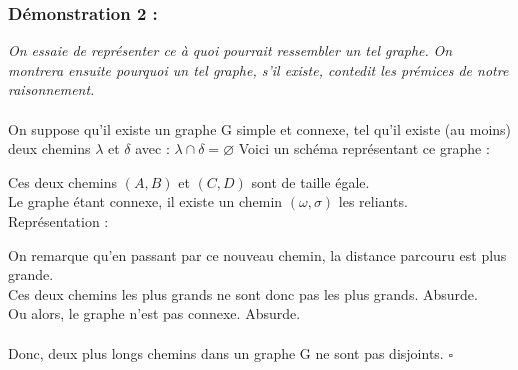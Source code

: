 \documentclass{article}
\begin{document}
        \subsubsection*{Démonstration 2 :}
            \textit{On essaie de représenter ce à quoi pourrait ressembler un tel graphe.}
            \textit{On montrera ensuite pourquoi un tel graphe, s'il existe, contedit les prémices de notre raisonnement.}\\\\
            \textrm{On suppose qu'il existe un graphe G simple et connexe, tel qu'il existe (au moins) deux chemins $\lambda$ et $\delta$ avec :}
            $
            \lambda \cap \delta = \varnothing
            $
            \textrm{Voici un schéma représentant ce graphe :}
            \begin{center}
            \end{center}
            \textrm{Ces deux chemins $(A,B)$ et $(C,D)$ sont de taille égale.}\\
            \textrm{Le graphe étant connexe, il existe un chemin $(\omega,\sigma)$ les reliants.}\\
            \textrm{Représentation :}
            \begin{center}
            \end{center}
            \textrm{On remarque qu'en passant par ce nouveau chemin, la distance parcouru est plus grande.}\\
            \textrm{Ces deux chemins les plus grands ne sont donc pas les plus grands. Absurde.}\\
            \textrm{Ou alors, le graphe n'est pas connexe. Absurde.}\\\\
            \textrm{Donc, deux plus longs chemins dans un graphe G ne sont pas disjoints.}
            $\square $
\end{document}

